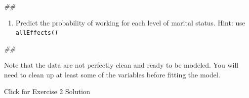 \documentclass[
]{book}
\newenvironment{Shaded}{\begin{snugshade}}{\end{snugshade}}
\newcommand{\CommentTok}[1]{\textcolor[rgb]{0.56,0.35,0.01}{\textit{#1}}}
\providecommand{\tightlist}{%
  \setlength{\itemsep}{0pt}\setlength{\parskip}{0pt}}
\begin{document}
\begin{Shaded}
\begin{Highlighting}[]
\CommentTok{\#\# }
\end{Highlighting}
\end{Shaded}

\begin{enumerate}
\def\labelenumi{\arabic{enumi}.}
\setcounter{enumi}{1}
\tightlist
\item
  Predict the probability of working for each level of marital status. Hint: use \texttt{allEffects()}
\end{enumerate}

\begin{Shaded}
\begin{Highlighting}[]
\CommentTok{\#\# }
\end{Highlighting}
\end{Shaded}

Note that the data are not perfectly clean and ready to be modeled. You will need to clean up at least some of the variables before fitting the model.

{Click for Exercise 2 Solution}
\end{document}
